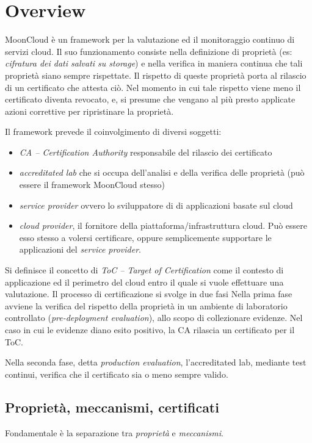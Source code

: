 \section{Overview}\label{sec:mooncloud-overview}
MoonCloud è un framework per la valutazione ed il monitoraggio continuo
di servizi cloud.
Il suo funzionamento consiste nella definizione di proprietà (es: \textit{cifratura
dei dati salvati su storage}) e nella verifica in maniera continua che tali
proprietà siano sempre rispettate. Il rispetto di queste proprietà porta al
rilascio di un certificato che attesta ciò. Nel momento in cui
tale rispetto viene meno il certificato diventa revocato, e, si presume
che vengano al più presto applicate azioni correttive per ripristinare
la proprietà.


Il framework prevede il coinvolgimento di diversi soggetti:
\begin{itemize}
	\item \textit{CA -- Certification Authority} responsabile del
	      rilascio dei certificato
	\item \textit{accreditated lab} che si occupa dell'analisi e della
	      verifica delle proprietà (può essere il framework MoonCloud stesso)
	\item \textit{service provider} ovvero lo sviluppatore di di applicazioni
	      basate sul cloud
	\item \textit{cloud provider}, il fornitore della piattaforma/infrastruttura
	      cloud. Può essere esso stesso a volersi certificare, oppure semplicemente
	      supportare le applicazioni del \textit{service provider}.
\end{itemize}

Si definisce il concetto di \textit{ToC -- Target of Certification} come il
contesto di applicazione ed il perimetro del cloud entro il quale
si vuole effettuare una valutazione.
Il processo di certificazione si svolge in due fasi Nella prima fase
avviene la verifica del rispetto della proprietà in un ambiente di
laboratorio controllato (\textit{pre-deployment evaluation}), allo scopo
di collezionare evidenze.
Nel caso in cui le evidenze diano esito positivo, la CA rilascia
un certificato per il ToC.

Nella seconda fase, detta \textit{production evaluation}, l'accreditated
lab, mediante test continui, verifica che il certificato sia o meno
sempre valido.

\subsection{Proprietà, meccanismi, certificati}
Fondamentale è la separazione tra \textit{proprietà} e \textit{meccanismi}.

